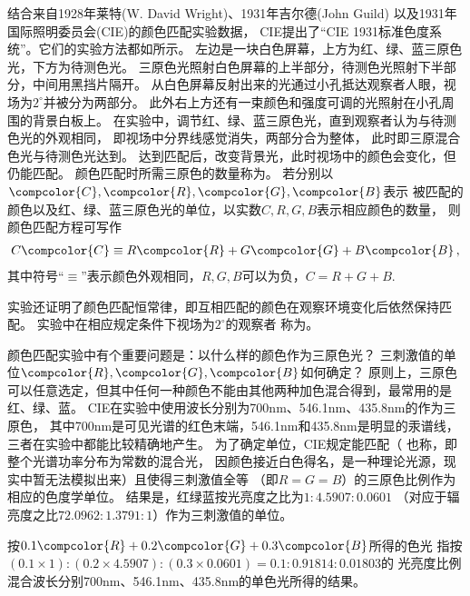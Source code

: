 结合来自1928年莱特(W. David Wright)、1931年吉尔德(John Guild)
以及1931年国际照明委员会(CIE)的颜色匹配实验数据，
CIE提出了“CIE 1931标准色度系统”。它们的实验方法都如所示。
左边是一块白色屏幕，上方为红、绿、蓝三原色光，下方为待测色光。
三原色光照射白色屏幕的上半部分，待测色光照射下半部分，中间用黑挡片隔开。
从白色屏幕反射出来的光通过小孔抵达观察者人眼，视场为$2^{\circ}$并被分为两部分。
此外右上方还有一束颜色和强度可调的光照射在小孔周围的背景白板上。
在实验中，调节红、绿、蓝三原色光，直到观察者认为与待测色光的外观相同，
即视场中分界线感觉消失，两部分合为整体，
此时即三原混合色光与待测色光达到。
达到匹配后，改变背景光，此时视场中的颜色会变化，但仍能匹配。
颜色匹配时所需三原色的数量称为。
若分别以$\compcolor{C},\compcolor{R},\compcolor{G},\compcolor{B}$表示
被匹配的颜色以及红、绿、蓝三原色光的单位，以实数$C,R,G,B$表示相应颜色的数量，
则颜色匹配方程可写作
\begin{align}\label{eq:colormatchrgb}
      C\compcolor{C}\equiv R\compcolor{R}+G\compcolor{G}+B\compcolor{B}\, ,
\end{align}
其中符号“$\equiv$”表示颜色外观相同，$R,G,B$可以为负，$C=R+G+B$.

实验还证明了颜色匹配恒常律，即互相匹配的颜色在观察环境变化后依然保持匹配。
实验中在相应规定条件下视场为$2^{\circ}$的观察者
称为。

颜色匹配实验中有个重要问题是：以什么样的颜色作为三原色光？
三刺激值的单位$\compcolor{R},\compcolor{G},\compcolor{B}$如何确定？
原则上，三原色可以任意选定，但其中任何一种颜色不能由其他两种加色混合得到，最常用的是红、绿、蓝。
CIE在实验中使用波长分别为700nm、546.1nm、435.8nm的作为三原色，
其中700nm是可见光谱的红色末端，546.1nm和435.8nm是明显的汞谱线，三者在实验中都能比较精确地产生。
为了确定单位，CIE规定能匹配（
也称，即整个光谱功率分布为常数的混合光，
因颜色接近白色得名，是一种理论光源，现实中暂无法模拟出来）且使得三刺激值全等
（即$R=G=B$）的三原色比例作为相应的色度学单位。
结果是，红绿蓝按光亮度之比为$1:4.5907:0.0601$
（对应于辐亮度之比$72.0962:1.3791:1$）作为三刺激值的单位。
\begin{example}
      按$0.1\compcolor{R}+0.2\compcolor{G}+0.3\compcolor{B}$所得的色光
      指按$(0.1\times1):(0.2\times4.5907):(0.3\times0.0601)=0.1:0.91814:0.01803$的
      光亮度比例混合波长分别700nm、546.1nm、435.8nm的单色光所得的结果。
\end{example}


